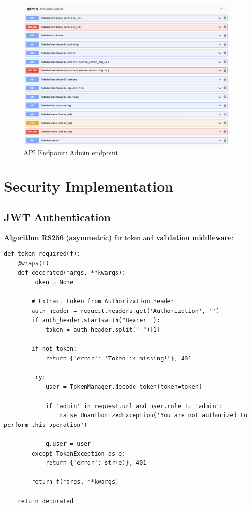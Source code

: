 \begin{figure}[!h]
    \centering
    \includegraphics[width=1\textwidth]{chapters/chapter_06/admin-operations}
    \caption{API Endpoint: Admin endpoint}
    \label{fig:api-admin-endpoint}
\end{figure}


\section{Security Implementation}\label{sec:security-implementation}

\subsection{JWT Authentication}\label{subsec:jwt-authentication}

\textbf{Algorithm RS256 (asymmetric)} for token and \textbf{validation middleware}:

\begin{lstlisting}[style=pythonstyle,label={lst:decoration-token-required},caption={Decoration 'Token Required'}]
def token_required(f):
    @wraps(f)
    def decorated(*args, **kwargs):
        token = None

        # Extract token from Authorization header
        auth_header = request.headers.get('Authorization', '')
        if auth_header.startswith("Bearer "):
            token = auth_header.split(" ")[1]

        if not token:
            return {'error': 'Token is missing!'}, 401

        try:
            user = TokenManager.decode_token(token=token)

            if 'admin' in request.url and user.role != 'admin':
                raise UnauthorizedException('You are not authorized to perform this operation')

            g.user = user
        except TokenException as e:
            return {'error': str(e)}, 401

        return f(*args, **kwargs)

    return decorated
\end{lstlisting}

